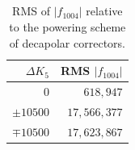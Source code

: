 %
%
%
%
%




\subsection{}

\begin{table}[!htb]
    \centering
    \begin{tabular}{rr}
        \toprule
        $\Delta K_5$         & RMS $|f_{1004}|$ \\
        \midrule
        $0$                  &            $618,947$ \\
        $\pm10500$             &         $17,566,377$ \\
        $\mp10500$             &         $17,623,867$ \\
        \bottomrule
    \end{tabular}
    \caption{RMS of $|f_{1004}|$ relative to the powering scheme of decapolar correctors.}
    \label{table:decapoles:impact:rdt_amplitude}
\end{table}

